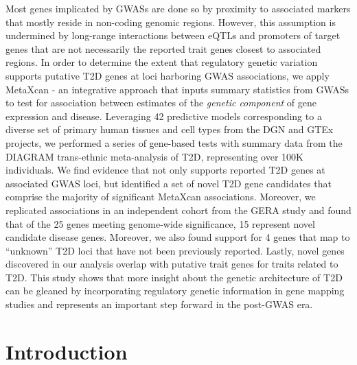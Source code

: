 \documentclass[10pt]{article}
\begin{document}
Most genes implicated by GWASs are done so by proximity to associated markers that mostly reside in non-coding genomic regions. However, this assumption is undermined by long-range interactions between eQTLs and promoters of target genes that are not necessarily the reported trait genes closest to associated regions. In order to determine the extent that regulatory genetic variation supports putative T2D genes at loci harboring GWAS associations, we apply MetaXcan - an integrative approach that inputs summary statistics from GWASs to test for association between estimates of the \textit{genetic component} of gene expression and disease. Leveraging 42 predictive models corresponding to a diverse set of primary human tissues and cell types from the DGN and GTEx projects, we performed a series of gene-based tests with summary data from the DIAGRAM trans-ethnic meta-analysis of T2D, representing over 100K individuals. We find evidence that not only supports reported T2D genes at associated GWAS loci, but identified a set of novel T2D gene candidates that comprise the majority of significant MetaXcan associations. Moreover, we replicated associations in an independent cohort from the GERA study and found that of the 25 genes meeting genome-wide significance, 15 represent novel candidate disease genes. Moreover, we also found support for 4 genes that map to ``unknown'' T2D loci that have not been previously reported. Lastly, novel genes discovered in our analysis overlap with putative trait genes for traits related to T2D. This study shows that more insight about the genetic architecture of T2D can be gleaned by incorporating regulatory genetic information in gene mapping studies and represents an important step forward in the post-GWAS era.  

\section*{Introduction}
\end{document}
